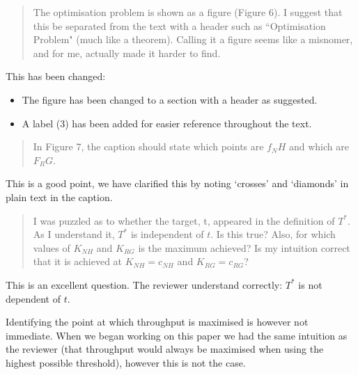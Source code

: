 \documentclass{article}
\begin{document}
\begin{quote}
    \begin{textit}
        {
        The optimisation problem is shown as a figure (Figure 6). I suggest
        that this be separated from the text with a header such as
        ``Optimisation Problem" (much like a theorem).  Calling it a figure
        seems like a misnomer, and for me, actually made it harder to find.
        }
    \end{textit}
\end{quote}

This has been changed:

\begin{itemize}
    \item The figure has been changed to a section with a header as suggested.
    \item A label (3) has been added for easier reference throughout the text.
\end{itemize}

\begin{quote}
    \begin{textit}
        {
        In Figure 7, the caption should state which points are \(f_NH\) and
        which are \(F_RG\).
        }
    \end{textit}
\end{quote}

This is a good point, we have clarified this by noting `crosses' and `diamonds' in plain text in the caption.

\begin{quote}
    \begin{textit}
        {
I was puzzled as to whether the target, t, appeared in the definition
of \(T^*\). As I understand it, \(T^*\) is independent of \(t\). Is this true?
Also, for which values of \(K_{NH}\) and \(K_{RG}\) is the maximum achieved? Is my
intuition correct that it is achieved at \(K_{NH} = c_{NH}\) and \(K_{RG} = c_{RG}\)?
        }
    \end{textit}
\end{quote}

This is an excellent question. The reviewer understand correctly: \(T^*\) is
not dependent of \(t\).

Identifying the point at which throughput is maximised is however not
immediate. When we began working on this paper we had the same intuition as the
reviewer (that throughput would always be maximised when using the highest
possible threshold), however this is not the case.
\end{document}
